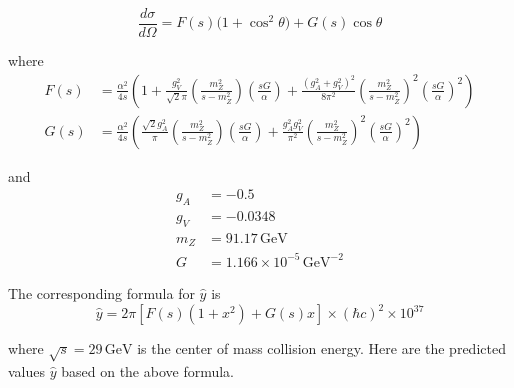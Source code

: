 \documentclass[12pt]{article}
\begin{document}
\begin{equation*}
\frac{d\sigma}{d\Omega}=F(s)\big(1+\cos^2\theta\big)+G(s)\cos\theta
\end{equation*}

where
\begin{align*}
F(s)&=\frac{\alpha^2}{4s}
\left(
1+\frac{g_V^2}{\sqrt{2}\pi}\left(\frac{m_Z^2}{s-m_Z^2}\right)\left(\frac{sG}{\alpha}\right)
+\frac{(g_A^2+g_V^2)^2}{8\pi^2}\left(\frac{m_Z^2}{s-m_Z^2}\right)^2\left(\frac{sG}{\alpha}\right)^2
\right)
\\
G(s)&=\frac{\alpha^2}{4s}
\left(
\frac{\sqrt{2}g_A^2}{\pi}\left(\frac{m_Z^2}{s-m_Z^2}\right)\left(\frac{sG}{\alpha}\right)
+\frac{g_A^2g_V^2}{\pi^2}\left(\frac{m_Z^2}{s-m_Z^2}\right)^2\left(\frac{sG}{\alpha}\right)^2
\right)
\end{align*}

and
\begin{align*}
g_A&=-0.5
\\
g_V&=-0.0348
\\
m_Z&=91.17\,\text{GeV}
\\
G&=1.166\times10^{-5}\,\text{GeV}^{-2}
\end{align*}

The corresponding formula for $\hat{y}$ is
\begin{equation*}
\hat{y}=2\pi\left[F(s)(1+x^2)+G(s)x\right]\times(\hbar c)^2\times10^{37}
\end{equation*}

where $\sqrt{s}=29\,\text{GeV}$ is the center of mass collision energy.
Here are the predicted values $\hat{y}$ based on the above formula.
\end{document}
